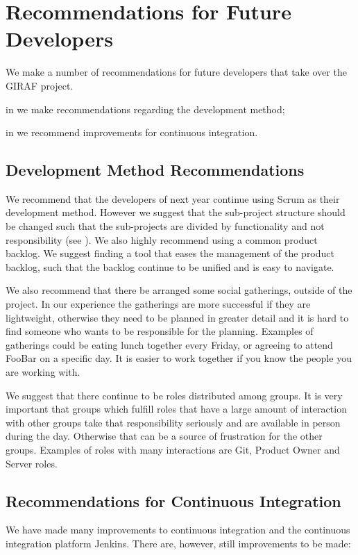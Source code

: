 \chapter{Recommendations for Future Developers}\label{chap:future_dev_recommendations}
We make a number of recommendations for future developers that take over the GIRAF project.

\begin{chapterorganization}
  \item in  we make recommendations regarding the development method;
  \item in  we recommend improvements for continuous integration.
\end{chapterorganization}

\section{Development Method Recommendations}\label{sec:dev_recommentations}
We recommend that the developers of next year continue using Scrum as their development method. However we suggest that the sub-project structure should be changed such that the sub-projects are divided by functionality and not responsibility (see ). We also highly recommend using a common product backlog. We suggest finding a tool that eases the management of the product backlog, such that the backlog continue to be unified and is easy to navigate.

We also recommend that there be arranged some social gatherings, outside of the project. In our experience the gatherings are more successful if they are lightweight, otherwise they need to be planned in greater detail and it is hard to find someone who wants to be responsible for the planning. Examples of gatherings could be eating lunch together every Friday, or agreeing to attend FooBar on a specific day. It is easier to work together if you know the people you are working with.

We suggest that there continue to be roles distributed among groups. It is very important that groups which fulfill roles that have a large amount of interaction with other groups take that responsibility seriously and are available in person during the day. Otherwise that can be a source of frustration for the other groups. Examples of roles with many interactions are Git, Product Owner and Server roles.

\section{Recommendations for Continuous Integration}\label{sec:ci_recommendations}
We have made many improvements to continuous integration and the continuous integration platform Jenkins. There are, however, still improvements to be made: 

